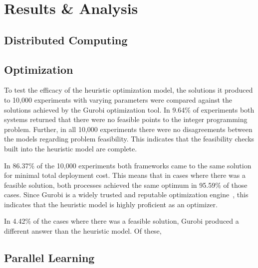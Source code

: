\documentclass[../mthe-493-final-project.tex]{subfiles}
\begin{document}
    \chapter{Results \& Analysis}
    \label{ch:results-and-analysis}
    \section{Distributed Computing}
    
    \section{Optimization}
    
    To test the efficacy of the heuristic optimization model, the solutions it produced to 10,000 experiments with varying parameters were compared against the solutions achieved by the Gurobi optimization tool. In 9.64\% of experiments both systems returned that there were no feasible points to the integer programming problem. Further, in all 10,000 experiments there were no disagreements between the models regarding problem feasibility. This indicates that the feasibility checks built into the heuristic model are complete.
    
    In 86.37\% of the 10,000 experiments both frameworks came to the same solution for minimal total deployment cost. This means that in cases where there was a feasible solution, both processes achieved the same optimum in 95.59\% of those cases. Since Gurobi is a widely trusted and reputable optimization engine~\cite{gurobi}, this indicates that the heuristic model is highly proficient as an optimizer.
    
    In 4.42\% of the cases where there was a feasible solution, Gurobi produced a different answer than the heuristic model. Of these,
    
    
    \section{Parallel Learning}
\end{document}
